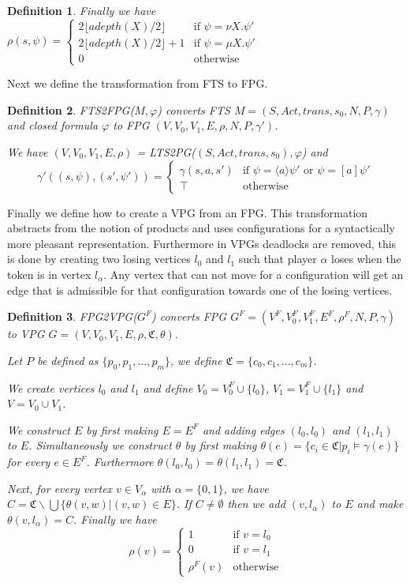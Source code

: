 \documentclass[]{article}
\newtheorem{definition}{Definition}[section]
\begin{document}
\begin{definition}
Finally we have $\rho(s, \psi) = \begin{cases}
2 \lfloor adepth(X) / 2 \rfloor & \text{if } \psi = \nu X. \psi'\\
2 \lfloor adepth(X) / 2 \rfloor + 1 & \text{if } \psi = \mu X. \psi'\\
0 & \text{otherwise}
\end{cases}$
\end{definition}
Next we define the transformation from FTS to FPG.
\begin{definition}
	\label{def_FTS2FPG}
	FTS2FPG($M, \varphi$) converts FTS $M = (S, Act, trans, s_0, N, P, \gamma)$ and closed formula $\varphi$ to FPG $(V, V_0, V_1, E, \rho, N, P, \gamma')$.
	
	We have $(V, V_0, V_1, E, \rho)$ = LTS2PG($(S, Act, trans, s_0), \varphi$) and
	\[ \gamma'((s, \psi),(s', \psi')) = \begin{cases}
	\gamma(s,a,s') & \text{if }\psi = \langle a \rangle \psi'\text{ or }\psi = [a]\psi' \\
	\top & \text{otherwise}
	\end{cases}\]
\end{definition}
Finally we define how to create a VPG from an FPG. This transformation abstracts from the notion of products and uses configurations for a syntactically more pleasant representation. Furthermore in VPGs deadlocks are removed, this is done by creating two losing vertices $l_0$ and $l_1$ such that player $\alpha$ loses when the token is in vertex $l_\alpha$. Any vertex that can not move for a configuration will get an edge that is admissible for that configuration towards one of the losing vertices.
\begin{definition}
	\label{def_FPG2VPG}
	FPG2VPG($G^F$) converts FPG $G^F = (V^F, V_0^F, V_1^F, E^F, \rho^F, N, P, \gamma)$ to VPG $G = (V, V_0, V_1, E, \rho, \mathfrak{C}, \theta)$.
	
	Let $P$ be defined as  $\{p_0, p_1, \dots, p_m\}$, we define $\mathfrak{C} = \{c_0, c_1, \dots, c_m\}$.
	
	We create vertices $l_0$ and $l_1$ and define $V_0 = V_0^F \cup \{l_0\}$, $V_1 = V_1^F \cup \{l_1\}$ and $V = V_0 \cup V_1$.
	
	We construct $E$ by first making $E = E^F$ and adding edges $(l_0, l_0)$ and $(l_1, l_1)$ to $E$. Simultaneously we construct $\theta$ by first making $\theta(e) = \{c_i \in \mathfrak{C} | p_i \models \gamma(e)\}$ for every $e \in E^F$. Furthermore $\theta(l_0,l_0) = \theta(l_1,l_1) = \mathfrak{C}$.
	
	Next, for every vertex $v \in V_\alpha$ with $\alpha = \{0,1\}$, we have $C = \mathfrak{C} \backslash \bigcup \{\theta(v,w)|(v,w) \in E\}$. If $C \neq \emptyset$ then we add $(v, l_\alpha)$ to $E$ and make $\theta(v,l_\alpha) = C$.
	Finally we have 
	\[ \rho(v) = \begin{cases}
	1  & \text{if } v = l_0 \\
	0 & \text{if } v = l_1 \\
	\rho^F(v) &\text{otherwise}
	\end{cases} \]
\end{definition}
\end{document}
